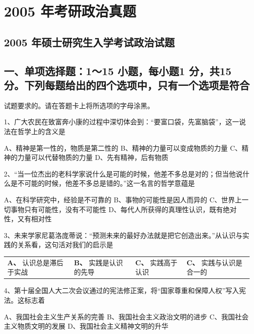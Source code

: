 \documentclass[UTF8,11pt]{ctexart}
\begin{document}
\section*{2005 年考研政治真题}
\subsection*{2005 年硕士研究生入学考试政治试题}

\subsection*{一、单项选择题：1～15 小题，每小题1 分，共15 分。下列每题给出的四个选项中，只有一个选项是符合}

试题要求的。请在答题卡上将所选项的字母涂黑。


1、广大农民在致富奔小康的过程中深切体会到：“要富口袋，先富脑袋”，这一说法在哲学上的含义是


A、精神是第一性的，物质是第二性的 B、精神的力量可以变成物质的力量 C、精神的力量可以代替物质的力量 D、先有精神，后有物质


2、“当一位杰出的老科学家说什么是可能的时候，他差不多总是对的；但当他说什么是不可能的时候，他差不多总是错的。”这一名言的哲学意蕴是


A、在科学研究中，经验是不可靠的 B、事物的可能性是因人而异的 C、世界上一切事物只有可能性，没有不可能性 D、每代人所获得的真理性认识，既有绝对性，又有相对性


3、未来学家尼葛洛庞蒂说：“预测未来的最好办法就是把它创造出来。”从认识与实践的关系看，这句活对我们的启示是


\begin{center}\begin{tabular}{>{\raggedright\arraybackslash}p{\dimexpr(\linewidth-8\tabcolsep)/4\relax}>{\raggedright\arraybackslash}p{\dimexpr(\linewidth-8\tabcolsep)/4\relax}>{\raggedright\arraybackslash}p{\dimexpr(\linewidth-8\tabcolsep)/4\relax}>{\raggedright\arraybackslash}p{\dimexpr(\linewidth-8\tabcolsep)/4\relax}}
\textbf{A、} 认识总是滞后于实战 & \textbf{B、} 实践是认识的先导 & \textbf{C、} 实践高于认识 & \textbf{C、} 实践与认识是合一的\\[.35em]\end{tabular}\end{center}

4、第十届全国人大二次会议通过的宪法修正案，将“国家尊重和保障人权”写入宪法。这标志着


A、我国社会主义生产关系的完善 B、我国社会主义政治文明的进步 C、我国社会主义物质文明的发展 D、我国社会主义精神文明的升华
\end{document}
